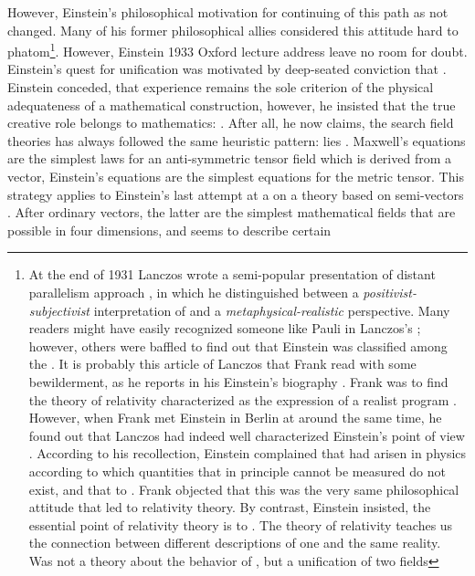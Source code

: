 \documentclass[draft]{article}
\begin{document}
However, Einstein's philosophical motivation for continuing of this path as not changed. Many of his former philosophical allies considered this attitude hard to phatom\footnote{At the end of 1931 Lanczos wrote a semi-popular presentation of distant parallelism approach \citep{Lanczos1931}, in which he distinguished between a \emph{positivist-subjectivist} interpretation of \rt and a \emph{metaphysical-realistic} perspective. Many readers might have easily recognized someone like Pauli in Lanczos's ; however, others were baffled to find out that Einstein was classified among the . It is probably this article of Lanczos that Frank read with some bewilderment, as he reports in his Einstein's biography \citep{Frank1947}. Frank was  to find the theory of relativity characterized as the expression of a realist program  \citep[215]{Frank1947}. However, when Frank met Einstein in Berlin at around the same time, he found out that Lanczos had indeed well characterized Einstein's point of view \citep[215f.]{Frank1947}. According to his recollection, Einstein complained that  had arisen in physics according to which quantities that in principle cannot be measured do not exist, and that to  \citep[216]{Frank1947}. Frank objected that this was the very same philosophical attitude that led to relativity theory. By contrast, Einstein insisted, the essential point of relativity theory is to   \citep[216]{Frank1947}. The theory of relativity teaches us the connection between different descriptions of one and the same reality. Was not a theory about the behavior of \rac, but a unification of two fields}. However, Einstein 1933 Oxford lecture address leave no room for doubt. Einstein's quest for unification was motivated by deep-seated conviction that  \citep{Einstein1933}. Einstein conceded, that experience remains the sole criterion of the physical adequateness of a mathematical construction, however, he insisted that the true creative role belongs to mathematics:  \citep[167]{Einstein1933}. After all, he now claims, the search field theories has always followed the same heuristic pattern:  lies  \citep[168]{Einstein1933}. Maxwell's equations are the simplest laws for an anti-symmetric tensor field which is derived from a vector, Einstein's equations are the simplest equations for the metric tensor\etc. This strategy applies to Einstein's last attempt at a \uft on a theory based on semi-vectors \citep{Einstein1932c,Einstein1933c,Einstein1934b,Einstein1933d}. After ordinary vectors, the latter are the simplest mathematical fields that are possible in four dimensions, and seems to describe certain 
\end{document}
